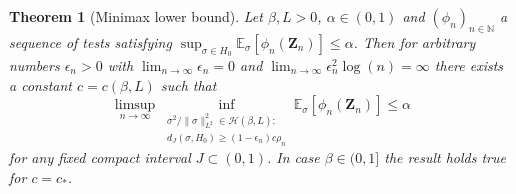 \documentclass[10.5pt,letter]{article}
\numberwithin{equation}{section}
\newtheorem{theorem}{Theorem}[section]
\theoremstyle{definition}
\newcommand{\N}{\mathbb{N}}
\newcommand{\E}{\mathbb{E}}
\newcommand{\1}{\mathbbm{1}}
\begin{document}
\begin{theorem}[Minimax lower bound]\label{thm:lower_bound}
   Let $\beta,L>0$, $\alpha\in (0,1)$ and $(\phi_n)_{n\in\N}$ a sequence of tests satisfying $\sup_{\sigma\in H_0} \E_\sigma[\phi_n(\mathbf{Z}_n)]\leq \alpha$. Then for arbitrary numbers $\epsilon_n>0$ with $\lim_{n\to\infty}\epsilon_n=0$ and $\lim_{n\to\infty}\epsilon_n^2 \log(n)=\infty$ there exists a constant $c=c(\beta,L)$ such that 
   \[ \limsup_{n\to\infty} \inf_{ \substack{\sigma^2/\|\sigma\|_{L^2}^2\in\mathcal{H}(\beta,L):\\ d_J(\sigma, H_0)\geq (1-\epsilon_n)c\rho_n}} \E_\sigma[\phi_n(\mathbf{Z}_n)]\leq \alpha \]   
   for any fixed compact interval $J\subset (0,1)$.
In case $\beta\in (0,1]$ the result holds true for $c=c_*$.
\end{theorem}
\end{document}
